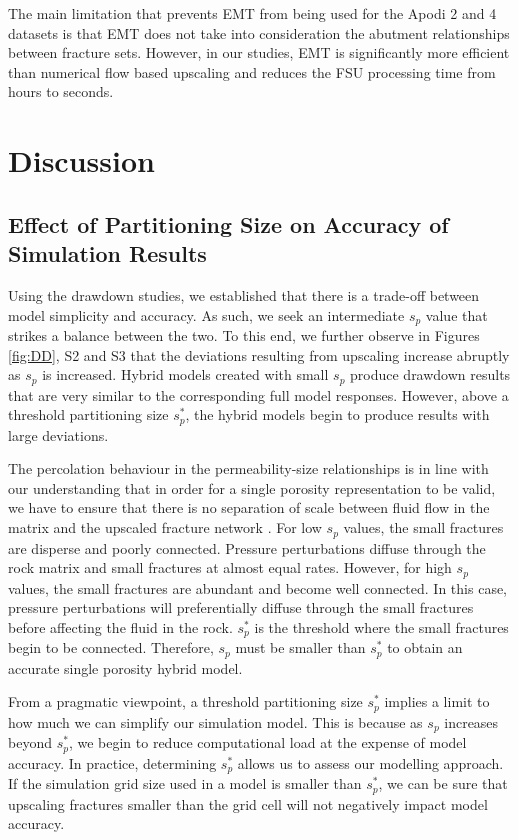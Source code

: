 \documentclass[draft]{agujournal2018}
\begin{document}
The main limitation that prevents EMT from being used for the Apodi 2 and 4 datasets is that EMT does not take into consideration the abutment relationships between fracture sets. However, in our studies, EMT is significantly more efficient than numerical flow based upscaling and reduces the FSU processing time from hours to seconds.

\section{Discussion}
\label{discussion}
\subsection{Effect of Partitioning Size on Accuracy of Simulation Results}
Using the drawdown studies, we established that there is a trade-off between model simplicity and accuracy. As such, we seek an intermediate $s_p$ value that strikes a balance between the two. To this end, we further observe in Figures \ref{fig:DD}, S2 and S3 that the deviations resulting from upscaling increase abruptly as $s_p$ is increased. Hybrid models created with small $s_p$ produce drawdown results that are very similar to the corresponding full model responses. However, above a threshold partitioning size $s_p^*$, the hybrid models begin to produce results with large deviations.

The percolation behaviour in the permeability-size relationships is in line with our understanding that in order for a single porosity representation to be valid, we have to ensure that there is no separation of scale between fluid flow in the matrix and the upscaled fracture network \citep{Matthai2004a}. For low $s_p$ values, the small fractures are disperse and poorly connected. Pressure perturbations diffuse through the rock matrix and small fractures at almost equal rates. However, for high $s_p$ values, the small fractures are abundant and become well connected. In this case, pressure perturbations will preferentially diffuse through the small fractures before affecting the fluid in the rock. $s_p^*$ is the threshold where the small fractures begin to be connected. Therefore, $s_p$ must be smaller than $s_p^*$ to obtain an accurate single porosity hybrid model.

From a pragmatic viewpoint, a threshold partitioning size $s_p^*$ implies a limit to how much we can simplify our simulation model. This is because as $s_p$ increases beyond $s_p^*$, we begin to reduce computational load at the expense of model accuracy. In practice, determining $s_p^*$ allows us to assess our modelling approach. If the simulation grid size used in a model is smaller than $s_p^*$, we can be sure that upscaling fractures smaller than the grid cell will not negatively impact model accuracy.
\end{document}
